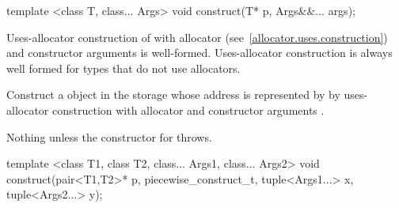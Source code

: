 %
%
\begin{itemdecl}
template <class T, class... Args>
  void construct(T* p, Args&&... args);
\end{itemdecl}

\begin{itemdescr}
\pnum
\requires
Uses-allocator construction of 
with allocator  (see~\ref{allocator.uses.construction})
and constructor arguments  is well-formed.
\enternote
Uses-allocator construction is always well formed
for types that do not use allocators.\exitnote

\pnum
\effects
Construct a  object in the storage
whose address is represented by 
by uses-allocator construction with allocator 
and constructor arguments .

\pnum
\throws
Nothing unless the constructor for  throws.
\end{itemdescr}

%
%
\begin{itemdecl}
template <class T1, class T2, class... Args1, class... Args2>
  void construct(pair<T1,T2>* p, piecewise_construct_t,
                 tuple<Args1...> x, tuple<Args2...> y);
\end{itemdecl}

